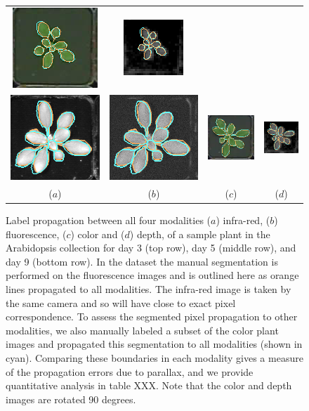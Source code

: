 \begin{figure}
\begin{centering}
\begin{tabular}{cccc}
\includegraphics[width=.18\textwidth]{Figures/LabelAlignment/day_5_hour_23-seg_rgb.png}&
\includegraphics[width=.18\textwidth]{Figures/LabelAlignment/day_5_hour_23-seg_depth.png}\\
\includegraphics[width=.18\textwidth]{Figures/LabelAlignment/day_9_hour_20-seg_ir.png}&
\includegraphics[width=.18\textwidth]{Figures/LabelAlignment/day_9_hour_20-seg_fmp.png}&
\includegraphics[width=.18\textwidth]{Figures/LabelAlignment/day_9_hour_20-seg_rgb.png}&
\includegraphics[width=.18\textwidth]{Figures/LabelAlignment/day_9_hour_20-seg_depth.png}\\
($a$) & ($b$) & ($c$) & ($d$) \\
\end{tabular}
\caption{Label propagation between all four modalities ($a$) infra-red, ($b$) fluorescence, ($c$) color and ($d$) depth, of a sample plant in the Arabidopsis collection for day 3 (top row), day 5 (middle row), and day 9 (bottom row).  In the dataset the manual segmentation is performed on the fluorescence images and is outlined here as orange lines propagated to all modalities.  The infra-red image is taken by the same camera and so will have close to exact pixel correspondence.  To assess the segmented pixel propagation to other modalities, we also manually labeled a subset of the color plant images and propagated this segmentation to all modalities (shown in cyan).  Comparing these boundaries in each modality gives a measure of the propagation errors due to parallax, and we provide quantitative analysis in table XXX.  Note that the color and depth images are rotated 90 degrees.}

\end{centering}
\end{figure}
